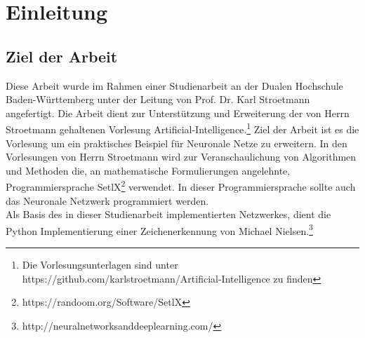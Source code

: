 \chapter{Einleitung}

\section{Ziel der Arbeit}
Diese Arbeit wurde im Rahmen einer Studienarbeit an der Dualen Hochschule Baden-Württemberg unter der Leitung von Prof. Dr. Karl Stroetmann angefertigt. Die Arbeit dient zur Unterstützung und Erweiterung der von Herrn Stroetmann gehaltenen Vorlesung \glqq Artificial-Intelligence\grqq .\footnote{Die Vorlesungsunterlagen sind unter https://github.com/karlstroetmann/Artificial-Intelligence zu finden} Ziel der Arbeit ist es die Vorlesung um ein praktisches Beispiel für Neuronale Netze zu erweitern. In den Vorlesungen von Herrn Stroetmann wird zur Veranschaulichung von Algorithmen und Methoden die, an mathematische Formulierungen angelehnte, Programmiersprache SetlX\footnote{https://randoom.org/Software/SetlX} verwendet. In dieser Programmiersprache sollte auch das Neuronale Netzwerk programmiert werden. \\
Als Basis des in dieser Studienarbeit implementierten Netzwerkes, dient die Python Implementierung einer Zeichenerkennung von Michael Nielsen.\footnote{http://neuralnetworksanddeeplearning.com/}

